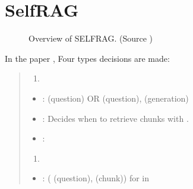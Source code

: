 \documentclass[letterpaper,11pt,english]{sphinxmanual}
\begin{document}
\section{Self\sphinxhyphen{}RAG}
\label{\detokenize{rag:self-rag}}\label{\detokenize{rag:ch-self-rag}}
\begin{figure}[htbp]
\centering
\capstart

\noindent{}
\caption{Overview of SELF\sphinxhyphen{}RAG. (Source )}\label{\detokenize{rag:id41}}\label{\detokenize{rag:fig-self-rag-paper}}\end{figure}

\sphinxAtStartPar
In the paper , Four types decisions are made:
\begin{quote}
\begin{enumerate}
%
\item {} 
\sphinxAtStartPar
{}

\end{enumerate}
\begin{itemize}
\item {} 
\sphinxAtStartPar
{}:
\sphinxhyphen{}  (question)
\sphinxhyphen{} OR  (question),  (generation)

\item {} 
\sphinxAtStartPar
{}:
Decides when to retrieve  chunks with .

\item {} 
\sphinxAtStartPar
{}:
\sphinxhyphen{} 
\sphinxhyphen{} 
\sphinxhyphen{} 

\end{itemize}
\begin{enumerate}
%
\setcounter{enumi}{1}
\item {} 
\sphinxAtStartPar
{}

\end{enumerate}
\begin{itemize}
\item {} 
\sphinxAtStartPar
{}:
\sphinxhyphen{} ( (question),  (chunk)) for  in 


\end{itemize}
\end{quote}
\end{document}

